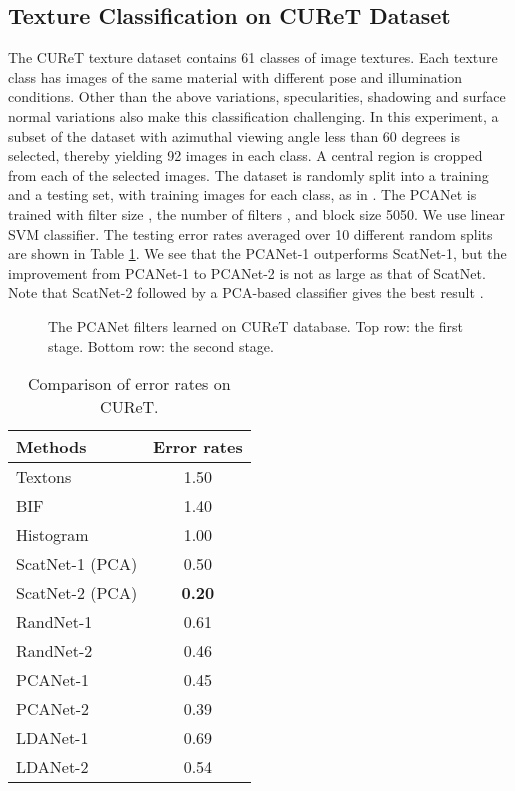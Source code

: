 \documentclass[10pt,journal,compsoc]{IEEEtran}
\begin{document}
\subsection{Texture Classification on CUReT Dataset}
The CUReT texture dataset contains 61 classes of image textures. Each texture class has images of the same material with different pose and illumination conditions. Other than the above variations, specularities, shadowing and surface normal variations also make this classification challenging. In this experiment, a subset of the dataset with azimuthal viewing angle less than 60 degrees is selected, thereby yielding 92 images in each class. A central  region is cropped from each of the selected images. The dataset is randomly split into a training and a testing set, with  training images for each class, as in \cite{Varma2009}. The PCANet is trained with filter size , the number of filters , and block size 5050. We use linear SVM classifier. The testing error rates averaged over 10 different random splits are shown in Table \ref{table: CUReT}. We see that the PCANet-1 outperforms ScatNet-1, but the improvement from PCANet-1 to PCANet-2 is not as large as that of ScatNet. Note that ScatNet-2 followed by a PCA-based classifier gives the best result \cite{Bruna2013}.

\begin{figure}[t]
\centering
{}
\caption{The PCANet filters learned on CUReT database. Top row: the first stage. Bottom row: the second stage. }\label{fig: CUReT_Filters}
\end{figure}

\begin{table}[tbp]\centering
\caption{Comparison of error rates  on CUReT.}
\begin{tabular}{l|c}
  \hline
Methods           & Error rates \\  \hline \hline
  Textons \cite{Hayman2004} & 1.50 \\
  BIF \cite{Crosier2010}  & 1.40 \\
  Histogram \cite{Broadhurst2006} & 1.00 \\
  ScatNet-1 (PCA) \cite{Bruna2013} & 0.50 \\
  ScatNet-2 (PCA) \cite{Bruna2013} & {\bf 0.20} \\ \hline
  RandNet-1  & 0.61 \\
  RandNet-2 & 0.46 \\
  PCANet-1    & 0.45  \\
  PCANet-2    & 0.39 \\
  LDANet-1    & 0.69  \\
  LDANet-2    & 0.54 \\
  \hline
\end{tabular}\label{table: CUReT}
\end{table}
\end{document}
